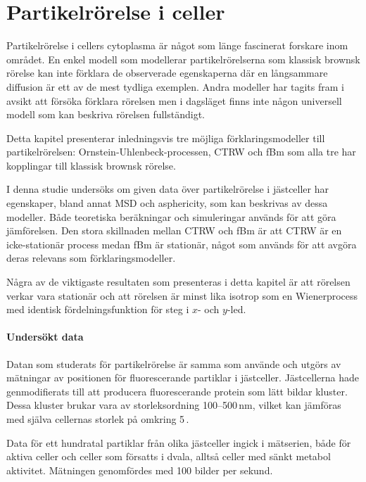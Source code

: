 \chapter{Partikelrörelse i celler}

Partikelrörelse i cellers cytoplasma är något som länge fascinerat forskare inom området. En enkel modell som modellerar partikelrörelserna som klassisk brownsk rörelse kan inte förklara de observerade egenskaperna där en långsammare diffusion är ett av de mest tydliga exemplen. Andra modeller har tagits fram i avsikt att försöka förklara rörelsen men i dagsläget finns inte någon universell modell som kan beskriva rörelsen fullständigt. 

Detta kapitel presenterar inledningsvis tre möjliga förklaringsmodeller till partikelrörelsen:  Ornstein-Uhlenbeck-processen, CTRW och fBm som alla tre har kopplingar till klassisk brownsk rörelse. 

I denna studie undersöks om given data över partikelrörelse i jästceller har egenskaper, bland annat MSD och asphericity, som kan beskrivas av dessa modeller. Både teoretiska beräkningar och simuleringar används för att göra jämförelsen. Den stora skillnaden mellan CTRW och fBm är att CTRW är en icke-stationär process medan fBm är stationär, något som används för att avgöra deras relevans som förklaringsmodeller. 

Några av de viktigaste resultaten som presenteras i detta kapitel är att rörelsen verkar vara stationär och att rörelsen är minst lika isotrop som en Wienerprocess med identisk fördelningsfunktion för steg i $x$- och $y$-led. 



\subsubsection{Undersökt data}
Datan som studerats för partikelrörelse är samma som \cite{Midtveldt_etal2016} använde och utgörs av mätningar av positionen för fluorescerande partiklar i jästceller. Jästcellerna hade genmodifierats till att producera fluorescerande protein som lätt bildar kluster. Dessa kluster brukar vara av storleksordning 100--500\,nm, vilket kan jämföras med själva cellernas storlek på omkring 5\,.

Data för ett hundratal partiklar från olika jästceller ingick i mätserien, både för aktiva celler och celler som försatts i dvala, alltså celler med sänkt metabol aktivitet. Mätningen genomfördes med 100 bilder per sekund.




